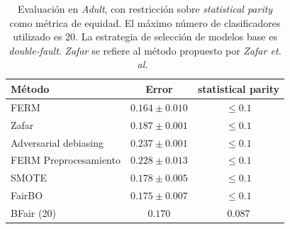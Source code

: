 \begin{table}[H]
    \centering

    \begin{tabular}{lcc}
    \toprule
        Método & Error & statistical parity \\
        \midrule \midrule
        FERM & $0.164 \pm 0.010$ & $\leq 0.1$ \\
        Zafar~\parencite{zafar2017fairness} & $0.187 \pm 0.001$ & $\leq 0.1$ \\
        Adversarial debiasing & $0.237 \pm 0.001$ & $\leq 0.1$ \\ 
        \midrule
        FERM Preprocesamiento & $0.228 \pm 0.013$ & $\leq 0.1$ \\
        SMOTE & $0.178 \pm 0.005$ & $\leq 0.1$ \\
        FairBO & $0.175 \pm 0.007$ & $\leq 0.1$ \\  
        \midrule
        BFair (20) & $0.170$ & $0.087$ \\
    \bottomrule
    \end{tabular}

    \caption{
    Evaluación en \emph{Adult}, con restricción sobre \emph{statistical parity} como métrica de equidad.
    El máximo número de clasificadores utilizado es 20.
    La estrategia de selección de modelos base es \emph{double-fault}.
    \emph{Zafar} se refiere al método propuesto por \emph{Zafar et. al.}~\parencite{zafar2017fairness}}
    
    \label{table:second-phase-vs-all}
\end{table}


